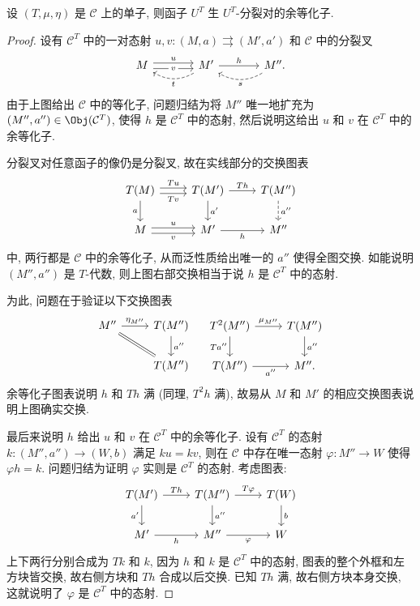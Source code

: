 \begin{lemma}\label{prop:UT-split-fork}
	设 $(T, \mu, \eta)$ 是 $\mathcal{C}$ 上的单子, 则函子 $U^T$ 生 $U^T$-分裂对的余等化子.
\end{lemma}
\begin{proof}
	设有 $\mathcal{C}^T$ 中的一对态射 $u, v: (M, a) \rightrightarrows (M', a')$ 和 $\mathcal{C}$ 中的分裂叉
	\begin{equation*}\begin{tikzcd}[column sep=large]
		M \arrow[shift left, r, "u"] \arrow[shift right, r, "v" description] & M' \arrow[r, "h"] \arrow[dashed, l, bend left, "t"] & M'' \arrow[dashed, l, bend left, "s"].
	\end{tikzcd}\end{equation*}
	由于上图给出 $\mathcal{C}$ 中的等化子, 问题归结为将 $M''$ 唯一地扩充为 $(M'', a'') \in \Obj(\mathcal{C}^T)$, 使得 $h$ 是 $\mathcal{C}^T$ 中的态射, 然后说明这给出 $u$ 和 $v$ 在 $\mathcal{C}^T$ 中的余等化子.
	
	分裂叉对任意函子的像仍是分裂叉, 故在实线部分的交换图表
	\[\begin{tikzcd}
		T(M) \arrow[shift left, r, "Tu"] \arrow[shift right, r, "Tv"'] \arrow[d, "a"'] & T(M') \arrow[r, "Th"] \arrow[d, "{a'}"] & T(M'') \arrow[dashed, d, "{a''}"] \\
		M \arrow[shift left, r, "u"] \arrow[shift right, r, "v"'] & M' \arrow[r, "h"'] & M''
	\end{tikzcd}\]
	中, 两行都是 $\mathcal{C}$ 中的余等化子, 从而泛性质给出唯一的 $a''$ 使得全图交换. 如能说明 $(M'', a'')$ 是 $T$-代数, 则上图右部交换相当于说 $h$ 是 $\mathcal{C}^T$ 中的态射.
	
	为此, 问题在于验证以下交换图表
	\[\begin{tikzcd}
		M'' \arrow[r, "{\eta_{M''}}"] \arrow[equal, rd] & T(M'') \arrow[d, "{a''}"] \\
		& T(M'')
	\end{tikzcd} \quad
	\begin{tikzcd}
		T^2(M'') \arrow[r, "{\mu_{M''}}"] \arrow[d, "{Ta''}"'] & T(M'') \arrow[d, "{a''}"] \\
		T(M'') \arrow[r, "{a''}"'] & M'' .
	\end{tikzcd}\]
	余等化子图表说明 $h$ 和 $Th$ 满 (同理, $T^2 h$ 满), 故易从 $M$ 和 $M'$ 的相应交换图表说明上图确实交换.
	
	最后来说明 $h$ 给出 $u$ 和 $v$ 在 $\mathcal{C}^T$ 中的余等化子. 设有 $\mathcal{C}^T$ 的态射 $k: (M'', a'') \to (W, b)$ 满足 $ku = kv$, 则在 $\mathcal{C}$ 中存在唯一态射 $\varphi: M'' \to W$ 使得 $\varphi h = k$. 问题归结为证明 $\varphi$ 实则是 $\mathcal{C}^T$ 的态射. 考虑图表:
	\[\begin{tikzcd}
		T(M') \arrow[r, "Th"] \arrow[d, "{a'}"'] & T(M'') \arrow[r, "T\varphi"] \arrow[d, "{a''}"] & T(W) \arrow[d, "b"] \\
		M' \arrow[r, "h"'] & M'' \arrow[r, "\varphi"'] & W
	\end{tikzcd}\]
	上下两行分别合成为 $Tk$ 和 $k$, 因为 $h$ 和 $k$ 是 $\mathcal{C}^T$ 中的态射, 图表的整个外框和左方块皆交换, 故右侧方块和 $Th$ 合成以后交换. 已知 $Th$ 满, 故右侧方块本身交换, 这就说明了 $\varphi$ 是 $\mathcal{C}^T$ 中的态射.
\end{proof}

